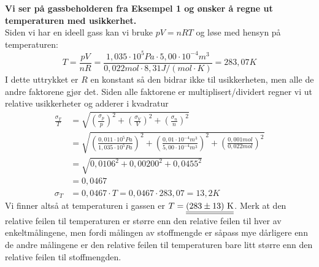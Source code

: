 \begin{texample}
{\bf Vi ser på gassbeholderen fra Eksempel 1 og ønsker å regne ut temperaturen med usikkerhet.}\\

Siden vi har en ideell gass kan vi bruke $pV = nRT$ og løse med hensyn på temperaturen:
\begin{displaymath}
	T = \frac{pV}{nR} = \frac{1,035\cdot 10^5\unit{Pa}\cdot5,00\cdot10^{-4}\unit{m^3}}{0,022\unit{mol}\cdot 8,31\unit{J/(mol\cdot K)}} = 283,07\unit{K}
\end{displaymath}
I dette uttrykket er $R$ en konstant så den bidrar ikke til usikkerheten, men alle de andre faktorene gjør det. Siden alle faktorene er multiplisert/dividert regner vi ut relative usikkerheter og adderer i kvadratur
\begin{align*}
	\frac{\sigma_T}{T} &= \sqrt{\left(\frac{\sigma_p}{p}\right)^2 + \left(\frac{\sigma_V}{V}\right)^2 + \left(\frac{\sigma_n}{n}\right)^2}  \\
	&= \sqrt{\left(\frac{0,011\cdot10^5\unit{Pa}}{1,035\cdot10^5\unit{Pa}}\right)^2 + \left(\frac{0,01\cdot10^{-4}\unit{m^3}}{5,00\cdot10^{-4}\unit{m^3}}\right)^2 
	+ \left(\frac{0,001\unit{mol}}{0,022\unit{mol}}\right)^2}  \\
	&=\sqrt{0,0106^2 + 0,00200^2 + 0,0455^2} \\
	&= 0,0467 \\[12pt]
	\sigma_T &= 0,0467\cdot T = 0,0467\cdot283,07 = 13,2\unit{K}
\end{align*}
Vi finner altså at temperaturen i gassen er $T = \underline{\underline{(283\pm13)~\mathrm{K}}}$. Merk at den relative feilen til temperaturen er større enn den relative feilen til hver av enkeltmålingene, men fordi målingen av stoffmengde er såpass mye dårligere enn de andre målingene er den relative feilen til temperaturen bare litt større enn den relative feilen til stoffmengden.
\end{texample}